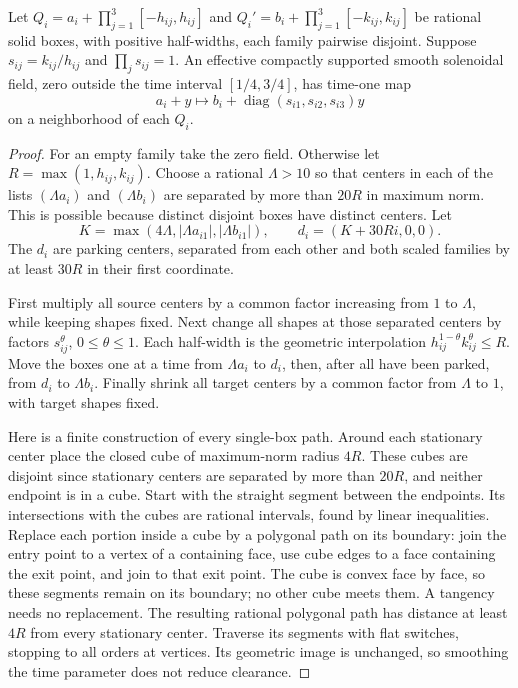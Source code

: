 \begin{theorem}
\label{lem:bb-balanced-box-routing}
Let $Q_i=a_i+\prod_{j=1}^3[-h_{ij},h_{ij}]$ and
$Q_i'=b_i+\prod_{j=1}^3[-k_{ij},k_{ij}]$ be rational solid boxes,
with positive half-widths, each family pairwise disjoint.  Suppose
$s_{ij}=k_{ij}/h_{ij}$ and $\prod_js_{ij}=1$.  An effective compactly
supported smooth solenoidal field, zero outside the time interval
$[1/4,3/4]$, has time-one map
\[
 a_i+y\longmapsto b_i+\operatorname{diag}(s_{i1},s_{i2},s_{i3})y
\]
on a neighborhood of each $Q_i$.
\end{theorem}
\begin{proof}\label{proof:bb-balanced-box-routing}
For an empty family take the zero field.  Otherwise let
$R=\max(1,h_{ij},k_{ij})$.  Choose a rational $\Lambda>10$ so that
centers in each of the lists $(\Lambda a_i)$ and $(\Lambda b_i)$
are separated by more than $20R$ in maximum norm.  This is possible
because distinct disjoint boxes have distinct centers.  Let
\[
 K=\max(4\Lambda,|\Lambda a_{i1}|,|\Lambda b_{i1}|),
 \qquad d_i=(K+30Ri,0,0).
\]
The $d_i$ are parking centers, separated from each other and both scaled
families by at least $30R$ in their first coordinate.

First multiply all source centers by a common factor increasing from
$1$ to $\Lambda$, while keeping shapes fixed.  Next change all shapes
at those separated centers by factors $s_{ij}^{\theta}$,
$0\le\theta\le1$.  Each half-width is the geometric interpolation
$h_{ij}^{1-\theta}k_{ij}^{\theta}\le R$.
Move the boxes one at a time from $\Lambda a_i$ to $d_i$, then,
after all have been parked, from $d_i$ to $\Lambda b_i$.
Finally shrink all target centers by a common factor from $\Lambda$
to $1$, with target shapes fixed.

Here is a finite construction of every single-box path.  Around each
stationary center place the closed cube of maximum-norm radius $4R$.
These cubes are disjoint since stationary centers are separated by
more than $20R$, and neither endpoint is in a cube.  Start with the
straight segment between the endpoints.  Its intersections with the
cubes are rational intervals, found by linear inequalities.  Replace
each portion inside a cube by a polygonal path on its boundary: join
the entry point to a vertex of a containing face, use cube edges to a
face containing the exit point, and join to that exit point.  The cube
is convex face by face, so these segments remain on its boundary;
no other cube meets them.  A tangency needs no replacement.  The
resulting rational polygonal path has distance at least $4R$ from
every stationary center.  Traverse its segments with flat switches,
stopping to all orders at vertices.  Its geometric image is unchanged,
so smoothing the time parameter does not reduce clearance.


\end{proof}

